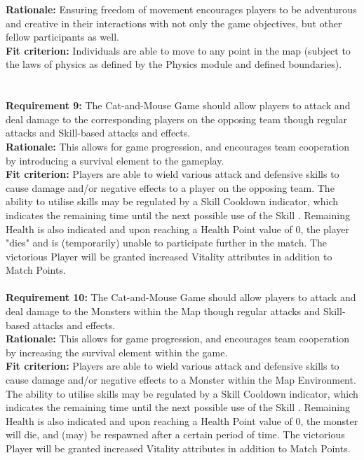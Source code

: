 \documentclass[12pt, titlepage]{article}
\begin{document}
\textbf{Rationale:}  Ensuring freedom of movement encourages players to be adventurous and creative in their interactions with not only the game objectives, but other fellow participants as well.\\
\textbf{Fit criterion:}  Individuals are able to move to any point in the map (subject to the laws of physics as defined by the Physics module and defined boundaries).\\
\\
\\
\textbf{Requirement 9:}  The Cat-and-Mouse Game should allow players to attack and deal damage to the corresponding players on the opposing team though regular attacks and Skill-based attacks and effects. \\
\textbf{Rationale:}  This allows for game progression, and encourages team cooperation by introducing a survival element to the gameplay.\\
\textbf{Fit criterion:}  Players are able to wield various attack and defensive skills to cause damage and/or negative effects to a player on the opposing team. The ability to utilise  skills may be regulated by a Skill Cooldown indicator, which indicates the remaining time until the next possible use of the Skill . Remaining Health is also indicated and upon reaching a Health Point value of 0, the player "dies" and is (temporarily) unable to participate further in the match. The victorious Player will be granted increased Vitality attributes in addition to Match Points.
\\
\\
\textbf{Requirement 10:}  The Cat-and-Mouse Game should allow players to attack and deal damage to the Monsters within the Map though regular attacks and Skill-based attacks and effects. \\
\textbf{Rationale:}  This allows for game progression, and encourages team cooperation by increasing the survival element within the game.\\
\textbf{Fit criterion:}  Players are able to wield various attack and defensive skills to cause damage and/or negative effects to a Monster within the Map Environment. The ability to utilise  skills may be regulated by a Skill Cooldown indicator, which indicates the remaining time until the next possible use of the Skill . Remaining Health is also indicated and upon reaching a Health Point value of 0, the monster will die, and (may) be respawned after a certain period of time. The victorious Player will be granted increased Vitality attributes in addition to Match Points.
\end{document}
